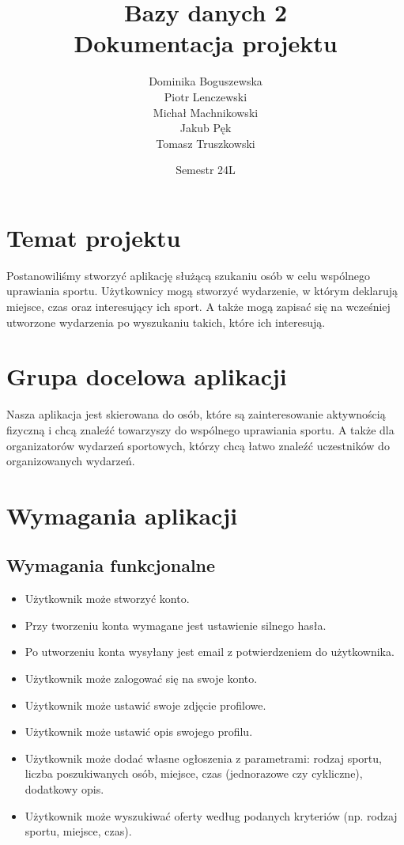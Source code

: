 \documentclass[11pt,a4paper]{article}
\title{Bazy danych 2 \\
Dokumentacja projektu}
\author{Dominika Boguszewska \\
Piotr Lenczewski \\
Michał Machnikowski \\
Jakub Pęk \\
Tomasz Truszkowski}
\date{Semestr 24L}
\begin{document}
\maketitle

\tableofcontents

\newpage

\section{Temat projektu}

Postanowiliśmy stworzyć aplikację służącą szukaniu osób w celu wspólnego uprawiania sportu. Użytkownicy mogą stworzyć wydarzenie, w którym deklarują miejsce, czas oraz interesujący ich sport. A także mogą zapisać się na wcześniej utworzone wydarzenia po wyszukaniu takich, które ich interesują.

\section{Grupa docelowa aplikacji}

Nasza aplikacja jest skierowana do osób, które są zainteresowanie aktywnością fizyczną i chcą znaleźć towarzyszy do wspólnego uprawiania sportu. A także dla organizatorów wydarzeń sportowych, którzy chcą łatwo znaleźć uczestników do organizowanych wydarzeń.

\section{Wymagania aplikacji}

\subsection{Wymagania funkcjonalne}

\begin{itemize}
    \item Użytkownik może stworzyć konto.
    \item Przy tworzeniu konta wymagane jest ustawienie silnego hasła.
    \item Po utworzeniu konta wysyłany jest email z potwierdzeniem do użytkownika.
    \item Użytkownik może zalogować się na swoje konto.
    \item Użytkownik może ustawić swoje zdjęcie profilowe.
    \item Użytkownik może ustawić opis swojego profilu.
    \item Użytkownik może dodać własne ogłoszenia z parametrami: rodzaj sportu, liczba poszukiwanych osób, miejsce, czas (jednorazowe czy cykliczne), dodatkowy opis.
    \item Użytkownik może wyszukiwać oferty według podanych kryteriów (np. rodzaj sportu, miejsce, czas).
\end{itemize}
 
\end{document}
